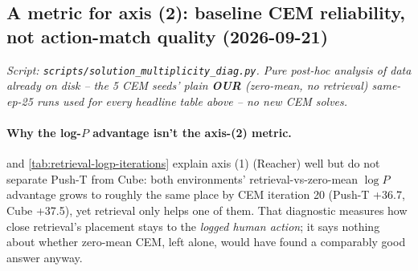 \documentclass[11pt]{article}
\begin{document}
\subsection{A metric for axis (2): baseline CEM reliability, not action-match quality
(2026-09-21)}
\label{sec:baseline-cem-reliability}
\emph{Script: \texttt{scripts/solution\_multiplicity\_diag.py}. Pure post-hoc analysis of
data already on disk -- the 5 CEM seeds' plain \textbf{OUR} (zero-mean, no retrieval)
same-ep-25 runs used for every headline table above -- no new CEM solves.}

\paragraph{Why the log-$P$ advantage isn't the axis-(2) metric.} 
and \cref{tab:retrieval-logp-iterations} explain axis (1) (Reacher) well but do not separate
Push-T from Cube: both environments' retrieval-vs-zero-mean $\log P$ advantage grows to
roughly the same place by CEM iteration 20 (Push-T +36.7, Cube +37.5), yet retrieval only
helps one of them. That diagnostic measures how close retrieval's placement stays to the
\emph{logged human action}; it says nothing about whether zero-mean CEM, left alone, would
have found a comparably good answer anyway.
\end{document}
